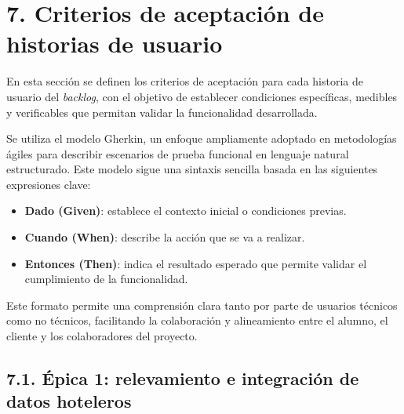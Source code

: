 \documentclass[
11pt, %
]{charter}
\begin{document}
\section{7. Criterios de aceptación de historias de usuario}
\label{sec:criteriosAceptacion}

En esta sección se definen los criterios de aceptación para cada historia de usuario del \textit{backlog}, con el objetivo de establecer condiciones específicas, medibles y verificables que permitan validar la funcionalidad desarrollada.

Se utiliza el modelo Gherkin, un enfoque ampliamente adoptado en metodologías ágiles para describir escenarios de prueba funcional en lenguaje natural estructurado. Este modelo sigue una sintaxis sencilla basada en las siguientes expresiones clave:

\begin{itemize}
  \item \textbf{Dado (Given)}: establece el contexto inicial o condiciones previas.
  \item \textbf{Cuando (When)}: describe la acción que se va a realizar.
  \item \textbf{Entonces (Then)}: indica el resultado esperado que permite validar el cumplimiento de la funcionalidad.
\end{itemize}

Este formato permite una comprensión clara tanto por parte de usuarios técnicos como no técnicos, facilitando la colaboración y alineamiento entre el alumno, el cliente y los colaboradores del proyecto.

\subsection*{7.1. Épica 1: relevamiento e integración de datos hoteleros}
\end{document}

